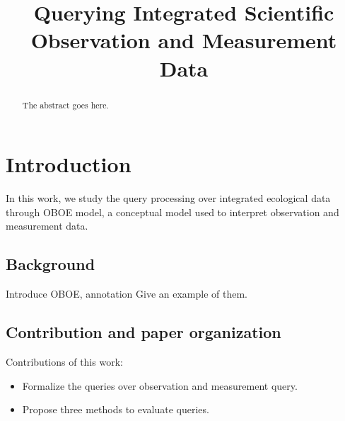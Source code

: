 \documentclass[conference]{IEEEtran}
\begin{document}
\title{Querying Integrated Scientific Observation and Measurement Data}

\author{
\and
{}
\and
{}
}

\maketitle


\begin{abstract}
The abstract goes here.
\end{abstract}


\section{Introduction}
In this work, we study the query processing over integrated ecological
data through OBOE model\cite{DBLP:conf/er/BowersMS08}, a conceptual model used to interpret
observation and measurement data. 

\subsection{Background}
Introduce OBOE, annotation
Give an example of them.

\subsection{Contribution and paper organization}
Contributions of this work:
\begin{itemize}
\item Formalize the queries over observation and measurement query.
\item Propose three methods to evaluate queries. 
\end{itemize}
\end{document}
